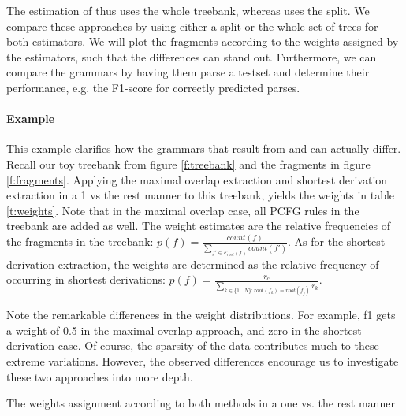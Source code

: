 The estimation of \ddop{} thus uses the whole treebank, whereas \dops{} uses the split. We compare these approaches by using either a split or the whole set of trees for both estimators. We will plot the fragments according to the weights assigned by the estimators, such that the differences can stand out.
Furthermore, we can compare the grammars by having them parse a testset and determine their performance, e.g. the F1-score for correctly predicted parses.


\paragraph{Example}
\FloatBarrier
This example clarifies how the grammars that result from \ddop{} and \dops{} can actually differ. Recall our toy treebank from figure \ref{f:treebank} and the fragments in figure \ref{f:fragments}. 
Applying the maximal overlap extraction and shortest derivation extraction in a 1 vs the rest manner to this treebank, yields the weights in table \ref{t:weights}.
 Note that in the maximal overlap case, all PCFG rules in the treebank are added as well. The weight estimates are the relative frequencies of the fragments in the treebank: $p(f)=\frac{count(f)}{\sum_{f'\in F_{root}(f)} count(f')}$\cite{sangati2011}. As for the shortest derivation extraction, the weights are determined as the relative frequency of occurring in shortest derivations: $p(f)=\frac{r_c}{\sum_{k\in \{1\ldots N\}:root(f_k)=root(f_j)} r_k}$\cite{zollmann2005}.

Note the remarkable differences in the weight distributions. For example, f1 gets a weight of 0.5 in the maximal overlap approach, and zero in the shortest derivation case. Of course, the sparsity of the data contributes much to these extreme variations. However, the observed differences encourage us to investigate these two approaches into more depth.



\begin{table}[h!]
\center

\caption{The weights assignment according to both methods in a one vs. the rest manner}
\label{t:weights}
\end{table}






